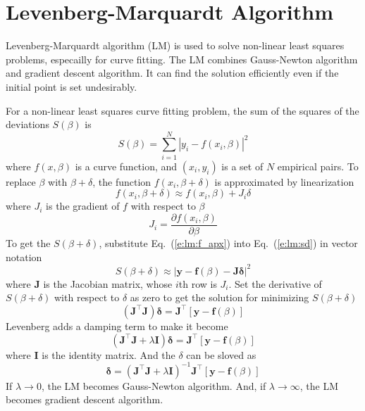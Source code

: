 \documentclass{turgon}
\begin{document}
\chapter{Levenberg-Marquardt Algorithm}

Levenberg-Marquardt algorithm (LM) is used to solve non-linear least squares
problems, especailly for curve fitting. The LM combines Gauss-Newton algorithm
and gradient descent algorithm. It can find the solution efficiently even if
the initial point is set undesirably.

For a non-linear least squares curve fitting problem, the sum of the squares of
the deviations $S(\beta)$ is
\begin{equation}
    \label{e:lm:sd}
    S(\beta) = \sum_{i = 1}^N \left| y_i - f(x_i, \beta) \right|^2
\end{equation}
where $f(x, \beta)$ is a curve function, and $(x_i, y_i)$ is a set of $N$
empirical pairs. To replace $\beta$ with $\beta + \delta$, the function $f(x_i,
\beta + \delta)$ is approximated by linearization
\begin{equation}
    f(x_i, \beta + \delta) \approx f(x_i, \beta) + J_i \delta
    \label{e:lm:f_apx}
\end{equation}
where $J_i$ is the gradient of $f$ with respect to $\beta$
\begin{equation*}
    J_i = \frac{\partial f(x_i, \beta)}{\partial \beta}
\end{equation*}
To get the $S(\beta + \delta)$, substitute Eq.~(\ref{e:lm:f_apx}) into
Eq.~(\ref{e:lm:sd}) in vector notation
\begin{equation*}
    S(\beta + \delta) \approx
    \left| \mathbf{y} - \mathbf{f}(\beta) - \mathbf{J} \mathbf{\delta} \right|^2
\end{equation*}
where $\mathbf{J}$ is the Jacobian matrix, whose $i$th row is $J_i$. Set the
derivative of $S(\beta + \delta)$ with respect to $\delta$ as zero to get the
solution for minimizing $S(\beta + \delta)$
\begin{equation*}
    \left( \mathbf{J}^\top \mathbf{J} \right) \mathbf{\delta} =
    \mathbf{J}^\top \left[ \mathbf{y} - \mathbf{f}(\beta) \right]
\end{equation*}
Levenberg adds a damping term to make it become
\begin{equation*}
    \left( \mathbf{J}^\top \mathbf{J} + \lambda \mathbf{I} \right) \mathbf{\delta} =
    \mathbf{J}^\top \left[ \mathbf{y} - \mathbf{f}(\beta) \right]
\end{equation*}
where $\mathbf{I}$ is the identity matrix. And the $\delta$ can be sloved as
\begin{equation}
    \mathbf{\delta} =
    \left( \mathbf{J}^\top \mathbf{J} + \lambda \mathbf{I} \right)^{-1}
    \mathbf{J}^\top \left[ \mathbf{y} - \mathbf{f}(\beta) \right]
    \label{e:lm:sol}
\end{equation}
If $\lambda \rightarrow 0$, the LM becomes Gauss-Newton algorithm. And, if
$\lambda \rightarrow \infty$, the LM becomes gradient descent algorithm.
\end{document}
